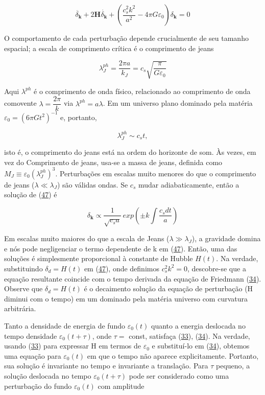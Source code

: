 \documentclass[a4paper,12pt]{article}
\begin{document}
\begin{equation}\label{eq47}
	\ddot{\delta_\mathbf{k}} + 2\mathbf{H}\dot{\delta_\mathbf{k}} + \left( \dfrac{c^2_s k^2}{a^2} -4\pi G\varepsilon_0\right)\delta_\mathbf{k} = 0
\end{equation}

O comportamento de cada perturbação depende crucialmente de seu tamanho espacial; a escala de comprimento crítica é o comprimento de jeans

\begin{equation}\label{eq48}
	\lambda^{ph}_J = \dfrac{2\pi a }{k_J} = c_s\sqrt{\dfrac{\pi}{G\varepsilon_0}}
\end{equation}

Aqui $\lambda^{ph}$ é o comprimento de onda físico, relacionado
ao comprimento de onda comovente $\lambda = \dfrac{2\pi}{k}$ via $\lambda^{ph} = a\lambda$. Em um universo plano dominado pela matéria $\varepsilon_0 = (6\pi G t^2)^{-1}$ e, portanto,

\begin{equation}\label{eq49}
	\lambda_J^{ph} \sim c_s t,
\end{equation}

isto é, o comprimento do jeans está na ordem do horizonte de som. Às vezes, em vez do
Comprimento de jeans, usa-se a massa de jeans, definida como $M_J \equiv\varepsilon_0 (\lambda_J^{ph})^3$.
Perturbações em escalas muito menores do que o comprimento de jeans ($\lambda \ll\lambda_J$) são válidas ondas. Se $c_s$ mudar adiabaticamente, então a solução de (\hyperref[eq47]{47}) é

\begin{equation}\label{eq50}
	\delta_\mathbf{k} \propto \dfrac{1}{\sqrt{c_s a}} \,exp\left( \pm k \int \dfrac{c_s dt}{a}\right)
\end{equation}

Em escalas muito maiores do que a escala de Jeans ($\lambda \gg \lambda_J$), a gravidade domina e nós
pode negligenciar o termo dependente de k em (\hyperref[eq47]{47}). Então, uma das soluções é simplesmente
proporcional à constante de Hubble $H (t)$. Na verdade, substituindo $\delta_d = H (t)$ em (\hyperref[eq47]{47}),
onde definimos $c^2_s k^2 = 0$, descobre-se que a equação resultante coincide com o tempo
derivada da equação de Friedmann (\hyperref[eq34]{34}). Observe que $\delta_d = H (t)$ é o decaimento
solução da equação de perturbação (H diminui com o tempo) em um dominado pela matéria
universo com curvatura arbitrária.

Tanto a densidade de energia de fundo $\varepsilon_0 (t)$ quanto a energia deslocada no tempo
densidade $\varepsilon_0 (t + \tau)$, onde $\tau =$ const, satisfaça (\hyperref[eq33]{33}), (\hyperref[eq34]{34}). Na verdade, usando (\hyperref[eq33]{33})
para expressar H em termos de $\varepsilon_0$ e substituí-lo em (\hyperref[eq34]{34}), obtemos uma equação para $\varepsilon_0 (t)$ em que o tempo não aparece explicitamente. Portanto, sua solução é invariante no tempo e invariante a translação. Para $\tau$ pequeno, a solução deslocada no tempo $\varepsilon_0 (t+ \tau)$ pode ser
considerado como uma perturbação do fundo $\varepsilon_0 (t)$ com amplitude
\end{document}
